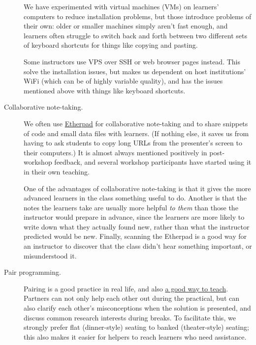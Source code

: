 \begin{description}
We have experimented with virtual machines (VMs) on learners' computers
to reduce installation problems, but those introduce problems of their
own: older or smaller machines simply aren't fast enough, and learners
often struggle to switch back and forth between two different sets of
keyboard shortcuts for things like copying and pasting.

Some instructors use VPS over SSH or web browser pages instead. This
solve the installation issues, but makes us dependent on host
institutions' WiFi (which can be of highly variable quality), and has
the issues mentioned above with things like keyboard shortcuts.
\item[Collaborative note-taking.]
We often use \href{http://etherpad.org}{Etherpad} for collaborative
note-taking and to share snippets of code and small data files with
learners. (If nothing else, it saves us from having to ask students to
copy long URLs from the presenter's screen to their computers.) It is
almost always mentioned positively in post-workshop feedback, and
several workshop participants have started using it in their own
teaching.

One of the advantages of collaborative note-taking is that it gives the
more advanced learners in the class something useful to do. Another is
that the notes the learners take are usually more helpful \emph{to them}
than those the instructor would prepare in advance, since the learners
are more likely to write down what they actually found new, rather than
what the instructor predicted would be new. Finally, scanning the
Etherpad is a good way for an instructor to discover that the class
didn't hear something important, or misunderstood it.
\item[Pair programming.]
Pairing is a good practice in real life, and also
\href{\{\{\%20page.root\%20\}\}/files/papers/porter-what-works-2013.pdf}{a
good way to teach}. Partners can not only help each other out during the
practical, but can also clarify each other's misconceptions when the
solution is presented, and discuss common research interests during
breaks. To facilitate this, we strongly prefer flat (dinner-style)
seating to banked (theater-style) seating; this also makes it easier for
helpers to reach learners who need assistance.


\end{description}
